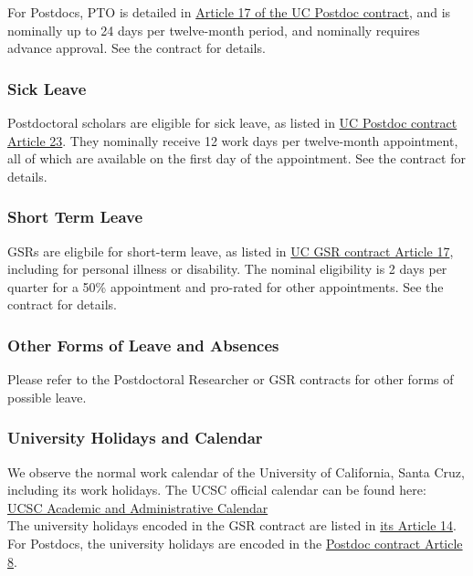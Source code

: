 \noindent
For Postdocs, PTO is detailed in \href{https://ucnet.universityofcalifornia.edu/wp-content/uploads/labor/bargaining-units/px/docs/px_tentative_agremeents_effective_12-09-2022.pdf}{Article 17 of the UC Postdoc contract}, and is nominally up to 24 days per twelve-month period, and nominally requires advance approval. See the contract for details.


\subsubsection{Sick Leave}

Postdoctoral scholars are eligible for sick leave, as listed in \href{https://ucnet.universityofcalifornia.edu/wp-content/uploads/labor/bargaining-units/px/docs/px_tentative_agremeents_effective_12-09-2022.pdf}{UC Postdoc contract Article 23}. They nominally receive 12 work days per twelve-month appointment, all of which are available on the first day of the appointment.  See the contract for details.

\subsubsection{Short Term Leave}

GSRs are eligbile for short-term leave, as listed in \href{https://ucnet.universityofcalifornia.edu/wp-content/uploads/labor/bargaining-units/br/docs/br_17_leaves_2022-2025.pdf}{UC GSR contract Article 17}, including for personal illness or disability. The nominal eligibility is 2 days per quarter for a 50\% appointment and pro-rated for other appointments. See the contract for details.


\subsubsection{Other Forms of Leave and Absences}

Please refer to the Postdoctoral Researcher or GSR contracts for other forms of possible leave. 

\subsubsection{University Holidays and Calendar}

We observe the normal work calendar of the University of California, Santa Cruz, including its work holidays.
The UCSC official calendar can be found here:\\

\noindent
\href{https://registrar.ucsc.edu/calendar/academiccalendar.html}{UCSC Academic and Administrative Calendar}\\

\noindent
The university holidays encoded in the GSR contract are listed in \href{https://qa.ucnet.universityofcalifornia.edu/labor/bargaining-units/br/docs/br_14_holidays_2022-2025.pdf}{its Article 14}. For Postdocs, the university holidays are encoded in the \href{https://ucnet.universityofcalifornia.edu/wp-content/uploads/labor/bargaining-units/px/docs/px_tentative_agremeents_effective_12-09-2022.pdf}{Postdoc contract Article 8}.
